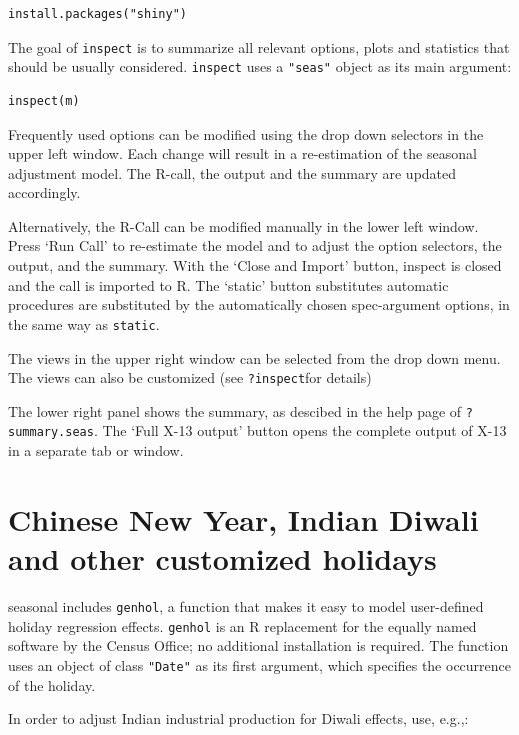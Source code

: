 \begin{verbatim}
install.packages("shiny")
\end{verbatim}

The goal of \texttt{inspect} is to summarize all relevant options, plots
and statistics that should be usually considered. \texttt{inspect} uses
a \texttt{"seas"} object as its main argument:

\begin{verbatim}
inspect(m)
\end{verbatim}

Frequently used options can be modified using the drop down selectors in
the upper left window. Each change will result in a re-estimation of the
seasonal adjustment model. The R-call, the output and the summary are
updated accordingly.

Alternatively, the R-Call can be modified manually in the lower left
window. Press `Run Call' to re-estimate the model and to adjust the
option selectors, the output, and the summary. With the `Close and
Import' button, inspect is closed and the call is imported to R. The
`static' button substitutes automatic procedures are substituted by the
automatically chosen spec-argument options, in the same way as
\texttt{static}.

The views in the upper right window can be selected from the drop down
menu. The views can also be customized (see \texttt{?inspect}for
details)

The lower right panel shows the summary, as descibed in the help page of
\texttt{?summary.seas}. The `Full X-13 output' button opens the complete
output of X-13 in a separate tab or window.

\section{Chinese New Year, Indian Diwali and other customized
holidays}\label{chinese-new-year-indian-diwali-and-other-customized-holidays}

seasonal includes \texttt{genhol}, a function that makes it easy to
model user-defined holiday regression effects. \texttt{genhol} is an R
replacement for the equally named software by the Census Office; no
additional installation is required. The function uses an object of
class \texttt{"Date"} as its first argument, which specifies the
occurrence of the holiday.

In order to adjust Indian industrial production for Diwali effects, use,
e.g.,:

